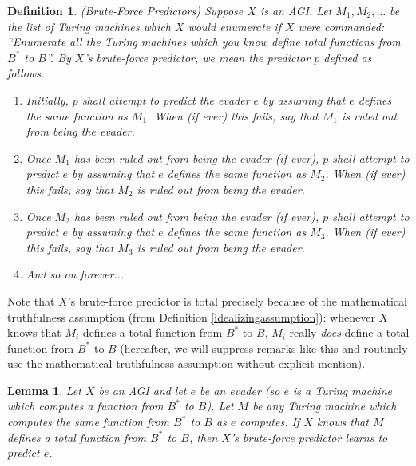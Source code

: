 \documentclass{article}
\newtheorem{definition}[theorem]{Definition}
\newtheorem{lemma}[theorem]{Lemma}
\begin{document}
\begin{definition}
\label{bruteforcepredictordefn}
    (Brute-Force Predictors)
    Suppose $X$ is an AGI. Let $M_1,M_2,\ldots$ be the list of Turing machines
    which $X$ would enumerate if $X$ were commanded: ``Enumerate all the Turing
    machines which you know define total functions from $B^*$ to $B$''.
    By \emph{$X$'s brute-force predictor}, we mean the predictor $p$ defined
    as follows.
    \begin{enumerate}
        \item
        Initially, $p$ shall attempt to predict the evader $e$ by assuming that $e$
        defines the same function as $M_1$. When (if ever) this fails,
        say that \emph{$M_1$ is ruled out from being the evader}.
        \item
        Once $M_1$ has been ruled out from being the evader (if ever),
        $p$ shall attempt to predict $e$ by assuming that $e$ defines the same
        function as $M_2$. When (if ever) this fails,
        say that \emph{$M_2$ is ruled out from being the evader}.
        \item
        Once $M_2$ has been ruled out from being the evader (if ever),
        $p$ shall attempt to predict $e$ by assuming that $e$ defines the same
        function as $M_3$. When (if ever) this fails,
        say that \emph{$M_3$ is ruled out from being the evader}.
        \item
        And so on forever...
    \end{enumerate}
\end{definition}

Note that $X$'s brute-force predictor
is total precisely because of the mathematical truthfulness assumption
(from Definition \ref{idealizingassumption}): whenever $X$ knows that
$M_i$ defines a total function from $B^*$ to $B$, $M_i$ really \emph{does}
define a total function from $B^*$ to $B$ (hereafter, we will suppress
remarks like this and routinely use the mathematical truthfulness assumption
without explicit mention).

\begin{lemma}
\label{knowingimplieslearninglemma}
    Let $X$ be an AGI and let $e$ be an evader (so $e$ is a Turing machine which
    computes a function from $B^*$ to $B$).
    Let $M$ be any Turing machine which computes the same function from $B^*$ to $B$
    as $e$ computes.
    If $X$ knows that $M$ defines a total function from $B^*$ to $B$,
    then $X$'s brute-force predictor learns to predict $e$.
\end{lemma}
\end{document}
